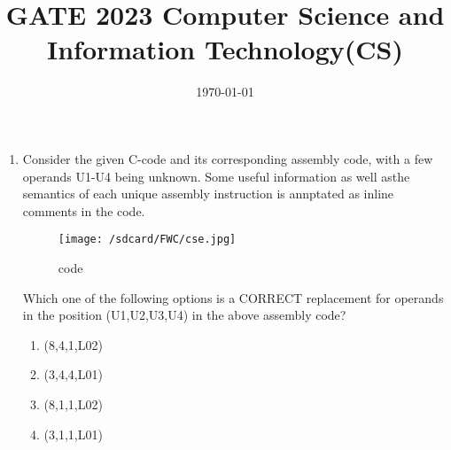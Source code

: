 \documentclass[12pt]{article}                        \usepackage{hyperref}                                \usepackage{listings}                                \usepackage{biblatex}                                \usepackage{tikz}                                    \usepackage{refstyle}                                \usepackage{mathabx}
\begin{document}
\title{\textbf{GATE 2023 Computer Science and Information Technology(CS)}}                   \date{\today}                      \maketitle                         \begin{enumerate}                  \item 
Consider the given C-code and its corresponding assembly code, with a few operands U1-U4 being unknown. Some useful information as well asthe semantics of each unique assembly instruction is annptated as inline comments in the code.                          \begin{figure}
\centering                              
\texttt{[image: /sdcard/FWC/cse.jpg]}        
\caption{code}                     \label{fig:code}
\end{figure}

Which one of the following options is a CORRECT replacement for operands in the position (U1,U2,U3,U4) in the above assembly code?

\begin{enumerate}[label=(\Alph*)]  \item (8,4,1,L02)                  \item (3,4,4,L01)
\item (8,1,1,L02)                  \item (3,1,1,L01)                  \end{enumerate}                    \end{enumerate}                    
\end{document}
